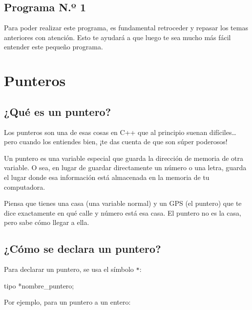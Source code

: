 \documentclass[
  11pt,
  a4paper,
  DIV=11,
  numbers=noendperiod]{scrreprt}
\newenvironment{Shaded}{\begin{snugshade}}{\end{snugshade}}
\newcommand{\NormalTok}[1]{\textcolor[rgb]{0.00,0.23,0.31}{#1}}
\newcommand{\OperatorTok}[1]{\textcolor[rgb]{0.37,0.37,0.37}{#1}}
\begin{document}
\section{Programa N.º 1}\label{programa-n.uxba-1}

Para poder realizar este programa, es fundamental retroceder y repasar
los temas anteriores con atención. Esto te ayudará a que luego te sea
mucho más fácil entender este pequeño programa.


\chapter{Punteros}\label{punteros}

\section{\texorpdfstring{¿Qué es un
\textbf{puntero?}}{¿Qué es un puntero?}}\label{quuxe9-es-un-puntero}

Los punteros son una de esas cosas en C++ que al principio suenan
difíciles\ldots{} pero cuando los entiendes bien, ¡te das cuenta de que
son súper poderosos!

Un puntero es una variable especial que guarda la dirección de memoria
de otra variable. O sea, en lugar de guardar directamente un número o
una letra, guarda el lugar donde esa información está almacenada en la
memoria de tu computadora.

Piensa que tienes una casa (una variable normal) y un GPS (el puntero)
que te dice exactamente en qué calle y número está esa casa. El puntero
no es la casa, pero sabe cómo llegar a ella.

\section{¿Cómo se declara un
puntero?}\label{cuxf3mo-se-declara-un-puntero}

Para declarar un puntero, se usa el símbolo \texttt{*}:

\begin{Shaded}
\begin{Highlighting}[]
\NormalTok{tipo }\OperatorTok{*}\NormalTok{nombre\_puntero}\OperatorTok{;}
\end{Highlighting}
\end{Shaded}

Por ejemplo, para un puntero a un entero:
\end{document}
